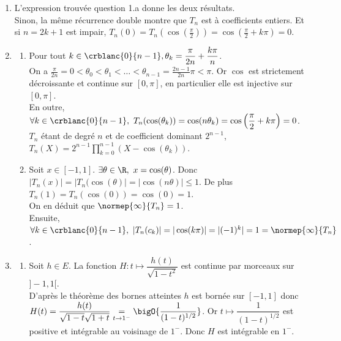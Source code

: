 \documentclass{book}
\begin{document}
\begin{enumerate}[leftmargin=*]
		On sait que $T_{n+2}=2XT_{n+1}-T_n$. Par hypothèse de récurrence $\deg(T_n)=n<n+2=\deg(2XT_{n+1}$ Donc $\deg(T_{n+2})=\deg(2XT_{n+1})=n+2$. De plus, $d_{n+2}=2d_{n+1}=2^{n+1}$.\\
		Ainsi par récurrence double, $\forall n\in \N^*,\ \deg(T_n)=n$ et $d_n=2^{n-1}$.
		\item L'expression trouvée question 1.a donne les deux résultats.\\
		Sinon, la même récurrence double montre que $T_n$ est à coefficients entiers. Et si $n=2k+1$ est impair, $T_n(0)=\displaystyle T_n\left(\cos\left(\frac{\pi}{2}\right)\right)=\cos\left(\frac{\pi}{2}+k\pi\right)=0$.
		\item 
		\begin{enumerate}[label=\alph*.]
			\item Pour tout $k\in \crblanc{0}{n-1}, \theta_k=\dfrac{\pi}{2n}+\dfrac{k\pi}{n}$.\\
			On a $\displaystyle\frac{\pi}{2n}=0<\theta_0<\theta_1<\dots<\theta_{n-1}=\frac{2n-1}{2n}\pi<\pi$. Or $\cos$ est strictement décroissante et continue sur $[0,\pi]$, en particulier elle est injective sur $[0,\pi]$.\\
			En outre, $\forall k\in \crblanc{0}{n-1},\ T_n(\cos(\theta_k))=\cos(n\theta_k)=\cos\left(\dfrac{\pi}{2}+k\pi\right)=0$.\\
			$T_n$ étant de degré $n$ et de coefficient dominant $2^{n-1}$, $T_n(X)=\displaystyle2^{n-1}\prod_{k=0}^{n-1}(X-\cos(\theta_k))$.
			\item Soit $x\in [-1,1]$. $\exists \theta\in \R,\ x=\cos(\theta)$. Donc $|T_n(x)|=|T_n(\cos(\theta)|=|\cos(n\theta)|\leq 1$. De plus $T_n(1)=T_n(\cos(0))=\cos(0)=1$.\\
			On en déduit que $\normep{\infty}{T_n}=1$.\\
			Ensuite, $\forall k\in \crblanc{0}{n-1},\ |T_n(c_k)|=|\cos(k\pi)|=|(-1)^k|=1=\normep{\infty}{T_n}$.
		\end{enumerate}
		\item 
		\begin{enumerate}[label=\alph*.]
			\item Soit $h\in E$. La fonction $H:t\mapsto\dfrac{h(t)}{\sqrt{1-t^2}}$ est continue par morceaux sur $]-1,1[$.\\
			D'après le théorème des bornes atteintes $h$ est bornée sur $[-1,1]$ donc $H(t)=\dfrac{h(t)}{\sqrt{1-t}\sqrt{1+t}}\underset{t\to1^-}=\bigO{\dfrac{1}{(1-t)^{1/2}}}$. Or $t\mapsto \dfrac{1}{(1-t)^{1/2}}$ est positive et intégrable au voisinage de $1^-$. Donc $H$ est intégrable en $1^-$.\\

\end{enumerate}
\end{enumerate}
\end{document}
